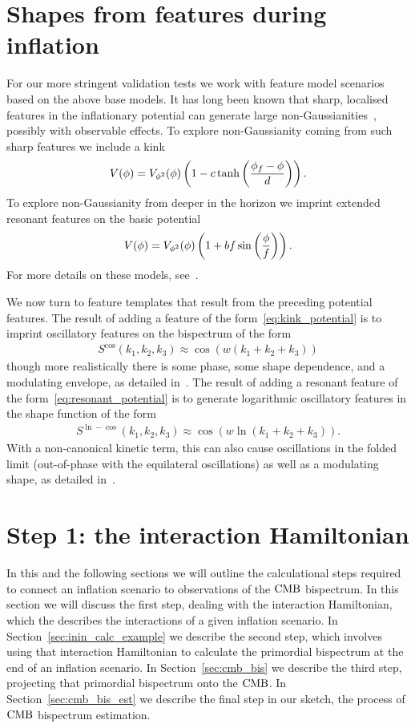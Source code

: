 \section{Shapes from features during inflation}
For our more stringent validation tests we work with feature model scenarios
based on the above base models.
It has long been known that sharp, localised features in the inflationary potential
can generate large non-Gaussianities~\cite{chen_easther_lim_1}, possibly with observable effects.
To explore non-Gaussianity coming from such sharp features we include
a kink~\cite{Adams_step}
\begin{align}\label{eq:kink_potential}
    V(\phi) = V_{\phi^2}(\phi)\left(1-c\tanh\left(\frac{\phi_f-\phi}{d}\right)\right).
\end{align}
To explore non-Gaussianity from deeper in the horizon we imprint
extended resonant features on the basic potential
\begin{align}\label{eq:resonant_potential}
    V(\phi) = V_{\phi^2}(\phi)\left(1+bf\sin\left(\frac{\phi}{f}\right)\right).
\end{align}
For more details on these models, see~\cite{chen_easther_lim_2}.


We now turn to feature templates that result from the preceding potential features.
The result of adding a feature of the form~\eqref{eq:kink_potential}
is to imprint oscillatory features on the bispectrum of the form
\begin{align}\label{cos_shape}
    S^{\cos}(k_1,k_2,k_3) \approx \cos(w(k_1+k_2+k_3))
\end{align}
though more realistically there is some phase, some shape dependence, and a modulating envelope,
as detailed in~\cite{adshead}.
The result of adding a resonant feature of the form~\eqref{eq:resonant_potential}
is to generate logarithmic oscillatory features in the shape function of the form
\begin{align}\label{ln_cos_shape}
    S^{\ln-\cos}(k_1,k_2,k_3) \approx \cos(w\ln(k_1+k_2+k_3)).
\end{align}
With a non-canonical kinetic term, this can also
cause oscillations in the folded limit (out-of-phase
with the equilateral oscillations) as well as a modulating shape,
as detailed in~\cite{chen_folded_resonant}.


    \section{Step 1: the interaction Hamiltonian}\label{sec:int_ham}
    In this and the following sections we will outline the calculational steps required to connect
    an inflation scenario to observations of the $\text{CMB}$ bispectrum. In this section we will discuss the first step,
    dealing with the interaction Hamiltonian,
    which the describes the interactions of a given inflation scenario.
    In Section~\ref{sec:inin_calc_example} we describe the second step,
    which involves using that interaction Hamiltonian to 
    calculate the primordial bispectrum at the end of an inflation scenario.
    In Section~\ref{sec:cmb_bis} we describe the third step,
    projecting that primordial bispectrum onto the $\text{CMB}$. In Section~\ref{sec:cmb_bis_est} we describe the final
    step in our sketch, the process of $\text{CMB}$ bispectrum estimation.
